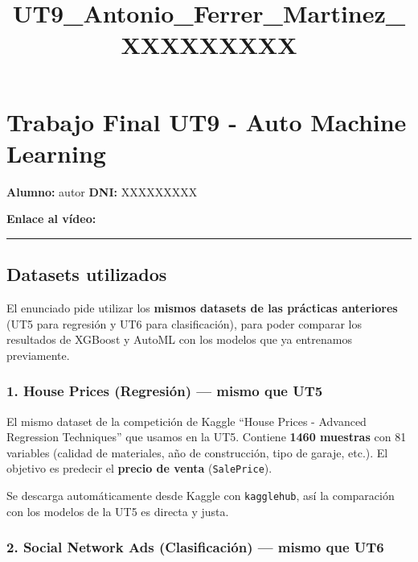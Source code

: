 \documentclass[11pt]{article}
\title{UT9\_Antonio\_Ferrer\_Martinez\_XXXXXXXXX}
\begin{document}
    
    \maketitle
    
    

    
    \section{Trabajo Final UT9 - Auto Machine
Learning}\label{trabajo-final-ut9---auto-machine-learning}

\textbf{Alumno:} autor \textbf{DNI:} XXXXXXXXX

\textbf{Enlace al vídeo:}

\begin{center}\rule{0.5\linewidth}{0.5pt}\end{center}

\subsection{Datasets utilizados}\label{datasets-utilizados}

El enunciado pide utilizar los \textbf{mismos datasets de las prácticas
anteriores} (UT5 para regresión y UT6 para clasificación), para poder
comparar los resultados de XGBoost y AutoML con los modelos que ya
entrenamos previamente.

\subsubsection{1. House Prices (Regresión) --- mismo que
UT5}\label{house-prices-regresiuxf3n-mismo-que-ut5}

El mismo dataset de la competición de Kaggle ``House Prices - Advanced
Regression Techniques'' que usamos en la UT5. Contiene \textbf{1460
muestras} con 81 variables (calidad de materiales, año de construcción,
tipo de garaje, etc.). El objetivo es predecir el \textbf{precio de
venta} (\texttt{SalePrice}).

Se descarga automáticamente desde Kaggle con \texttt{kagglehub}, así la
comparación con los modelos de la UT5 es directa y justa.

\subsubsection{2. Social Network Ads (Clasificación) --- mismo que
UT6}\label{social-network-ads-clasificaciuxf3n-mismo-que-ut6}
\end{document}
